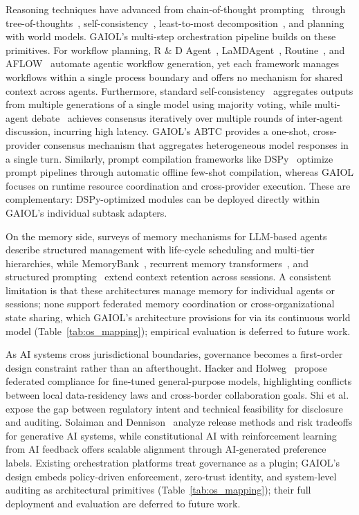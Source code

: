 \documentclass{iopjournal}
\begin{document}
Reasoning techniques have advanced from chain-of-thought prompting~\cite{CoT_NeurIPS22} through tree-of-thoughts~\cite{Tree_NeurIPS23}, self-consistency~\cite{SelfConsistency_ICLR23}, least-to-most decomposition~\cite{Least2Most_EMNLP22}, and planning with world models. GAIOL's multi-step orchestration pipeline builds on these primitives. For workflow planning, R \& D Agent~\cite{RDAgent}, LaMDAgent~\cite{qian2024chatdev}, Routine~\cite{Routine}, and AFLOW~\cite{AFLOW} automate agentic workflow generation, yet each framework manages workflows within a single process boundary and offers no mechanism for shared context across agents. Furthermore, standard self-consistency~\cite{SelfConsistency_ICLR23} aggregates outputs from multiple generations of a single model using majority voting, while multi-agent debate~\cite{Cooperation_NeurIPS23} achieves consensus iteratively over multiple rounds of inter-agent discussion, incurring high latency. GAIOL's ABTC provides a one-shot, cross-provider consensus mechanism that aggregates heterogeneous model responses in a single turn. Similarly, prompt compilation frameworks like DSPy~\cite{dspy} optimize prompt pipelines through automatic offline few-shot compilation, whereas GAIOL focuses on runtime resource coordination and cross-provider execution. These are complementary: DSPy-optimized modules can be deployed directly within GAIOL's individual subtask adapters.

On the memory side, surveys of memory mechanisms for LLM-based agents~\cite{MemoryOS} describe structured management with life-cycle scheduling and multi-tier hierarchies, while MemoryBank~\cite{MemoryBank_ACL23}, recurrent memory transformers~\cite{RecurrentMemory_NeurIPS23}, and structured prompting~\cite{LongContext_ICML24} extend context retention across sessions. A consistent limitation is that these architectures manage memory for individual agents or sessions; none support federated memory coordination or cross-organizational state sharing, which GAIOL's architecture provisions for via its continuous world model (Table~\ref{tab:os_mapping}); empirical evaluation is deferred to future work.

As AI systems cross jurisdictional boundaries, governance becomes a first-order design constraint rather than an afterthought. Hacker and Holweg~\cite{FineTuningReg} propose federated compliance for fine-tuned general-purpose models, highlighting conflicts between local data-residency laws and cross-border collaboration goals. Shi et al.~\cite{FM_Governance} expose the gap between regulatory intent and technical feasibility for disclosure and auditing. Solaiman and Dennison~\cite{SafetyTaxonomy_FAccT23} analyze release methods and risk tradeoffs for generative AI systems, while constitutional AI with reinforcement learning from AI feedback offers scalable alignment through AI-generated preference labels. Existing orchestration platforms treat governance as a plugin; GAIOL's design embeds policy-driven enforcement, zero-trust identity, and system-level auditing as architectural primitives (Table~\ref{tab:os_mapping}); their full deployment and evaluation are deferred to future work.
\end{document}
